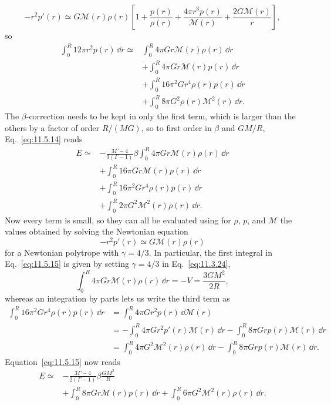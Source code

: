\[
  -r^2p'(r)
  \simeq
  G\mathcal{M}(r)\rho(r)
  \left[
    1+\frac{p(r)}{\rho(r)}
    +\frac{4\pi r^3p(r)}{\mathcal{M}(r)}
    +\frac{2G\mathcal{M}(r)}r
  \right],
\]
so
\[
  \begin{aligned}
  \int_0^R12\pi r^2p(r)\,\dd r
  \simeq{}&
  \int_0^R4\pi Gr\mathcal{M}(r)\rho(r)\,\dd r\\
  &+\int_0^R4\pi Gr\mathcal{M}(r)p(r)\,\dd r\\
  &+\int_0^R16\pi^2Gr^4\rho(r)p(r)\,\dd r\\
  &+\int_0^R8\pi G^2\rho(r)\mathcal{M}^2(r)\,\dd r.
  \end{aligned}
\]
The \(\beta\)-correction needs to be kept in only the first term, which is
larger than the others by a factor of order \(R/(MG)\), so to first order in
\(\beta\) and \(GM/R\), Eq.~\eqref{eq:11.5.14} reads
\begin{equation}
  \begin{aligned}
  E\simeq{}&
  -\frac{3\Gamma-4}{3(\Gamma-1)}\beta
  \int_0^R4\pi Gr\mathcal{M}(r)\rho(r)\,\dd r\\
  &+\int_0^R16\pi Gr\mathcal{M}(r)p(r)\,\dd r\\
  &+\int_0^R16\pi^2Gr^4\rho(r)p(r)\,\dd r\\
  &+\int_0^R2\pi G^2\mathcal{M}^2(r)\rho(r)\,\dd r.
  \end{aligned}
  \tag{11.5.15}\label{eq:11.5.15}
\end{equation}
Now every term is small, so they can all be evaluated using for \(\rho\),
\(p\), and \(\mathcal{M}\) the values obtained by solving the Newtonian
equation
\[
  -r^2p'(r)\simeq G\mathcal{M}(r)\rho(r)
\]
for a Newtonian polytrope with \(\gamma=4/3\). In particular, the first
integral in Eq.~\eqref{eq:11.5.15} is given by setting \(\gamma=4/3\) in
Eq.~\eqref{eq:11.3.24},
\[
  \int_0^R4\pi Gr\mathcal{M}(r)\rho(r)\,\dd r
  =
  -V
  =
  \frac{3GM^2}{2R},
\]
whereas an integration by parts lets us write the third term as
\[
  \begin{aligned}
  \int_0^R16\pi^2Gr^4\rho(r)p(r)\,\dd r
  &=
  \int_0^R4\pi Gr^2p(r)\,\dd\mathcal{M}(r)\\
  &=
  -\int_0^R4\pi Gr^2p'(r)\mathcal{M}(r)\,\dd r
  -\int_0^R8\pi Grp(r)\mathcal{M}(r)\,\dd r\\
  &=
  \int_0^R4\pi G^2\mathcal{M}^2(r)\rho(r)\,\dd r
  -\int_0^R8\pi Grp(r)\mathcal{M}(r)\,\dd r.
  \end{aligned}
\]
Equation~\eqref{eq:11.5.15} now reads
\[
  \begin{aligned}
  E\simeq{}&
  -\frac{3\Gamma-4}{2(\Gamma-1)}\beta\frac{GM^2}{R}\\
  &+\int_0^R8\pi Gr\mathcal{M}(r)p(r)\,\dd r
  +\int_0^R6\pi G^2\mathcal{M}^2(r)\rho(r)\,\dd r.
  \end{aligned}
\]
